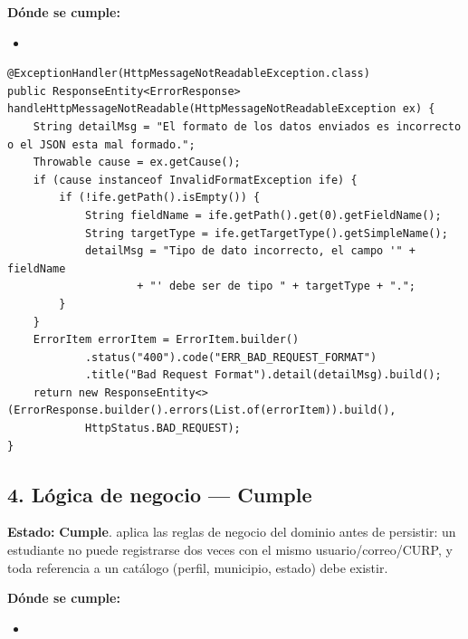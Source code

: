 \documentclass[11pt,a4paper]{article}
\newcommand{\Cumple}{\textcolor{cumpleColor}{\textbf{Cumple}}}
\begin{document}
\textbf{Dónde se cumple:}
\begin{itemize}[leftmargin=1.2cm,nosep]
\item \texttt{}
\end{itemize}

\begin{lstlisting}[style=javastyle,caption={Manejo de tipo de dato incorrecto en el cuerpo JSON (GlobalExceptionHandler.java)}]
@ExceptionHandler(HttpMessageNotReadableException.class)
public ResponseEntity<ErrorResponse> handleHttpMessageNotReadable(HttpMessageNotReadableException ex) {
    String detailMsg = "El formato de los datos enviados es incorrecto o el JSON esta mal formado.";
    Throwable cause = ex.getCause();
    if (cause instanceof InvalidFormatException ife) {
        if (!ife.getPath().isEmpty()) {
            String fieldName = ife.getPath().get(0).getFieldName();
            String targetType = ife.getTargetType().getSimpleName();
            detailMsg = "Tipo de dato incorrecto, el campo '" + fieldName
                    + "' debe ser de tipo " + targetType + ".";
        }
    }
    ErrorItem errorItem = ErrorItem.builder()
            .status("400").code("ERR_BAD_REQUEST_FORMAT")
            .title("Bad Request Format").detail(detailMsg).build();
    return new ResponseEntity<>(ErrorResponse.builder().errors(List.of(errorItem)).build(),
            HttpStatus.BAD_REQUEST);
}
\end{lstlisting}

\subsection{4. Lógica de negocio --- \Cumple}

\textbf{Estado:} \Cumple. \texttt{} aplica las reglas de negocio del dominio antes de persistir: un estudiante no puede registrarse dos veces con el mismo usuario/correo/CURP, y toda referencia a un catálogo (perfil, municipio, estado) debe existir.

\textbf{Dónde se cumple:}
\begin{itemize}[leftmargin=1.2cm,nosep]
\item \texttt{}
\end{itemize}
\end{document}
